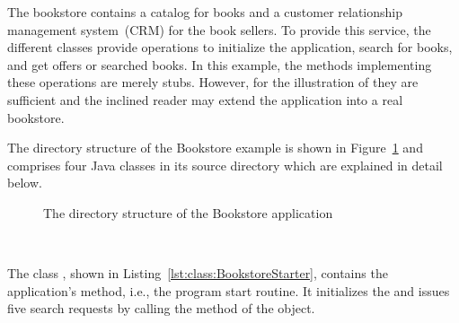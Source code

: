 \pagebreak

The bookstore contains a catalog for books and a customer relationship management system~(CRM) for the book sellers. To provide this service, the different classes provide operations to initialize the application, search for books, and get offers or searched books. In this example, the methods implementing these operations are merely stubs. However, for the illustration of \Kieker{} they are sufficient and the inclined reader may extend the application into a real bookstore. 

The directory structure of the Bookstore example is shown in Figure~\ref{fig:PlainBookstoreExample} and comprises four Java classes in its source directory  which are explained in detail below.

\begin{figure}[H]
\begin{graybox}
\end{graybox}

\caption{The directory structure of the Bookstore application}
\label{fig:PlainBookstoreExample}
\end{figure}


\quad\

\enlargethispage{1cm}

\noindent The class , shown in Listing~\ref{lst:class:BookstoreStarter}, contains the application's  method, i.e., the program start routine. It initializes the  and issues five search requests by calling the  method of the  object.

\setJavaCodeListing



